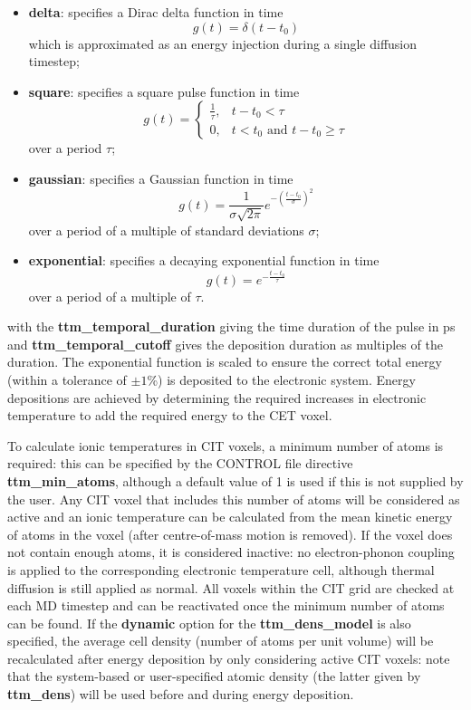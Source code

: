 \begin{itemize}
\item {\bf delta}: specifies a Dirac delta function in time \begin{equation*} g(t) = \delta (t - t_0) \end{equation*} which is approximated as an energy injection during a single diffusion timestep;
\item {\bf square}: specifies a square pulse function in time \begin{equation*} g(t) = \left\{\begin{array}{lr} \frac{1}{\tau}, & t - t_0 < \tau\\ 0, & t<t_0 \text{ and } t - t_0 \ge \tau \end{array} \right. \end{equation*} over a period $\tau$;
\item {\bf gaussian}: specifies a Gaussian function in time \begin{equation*} g(t) = \frac{1}{\sigma\sqrt{2\pi}}e^{-\left(\frac{t-t_0}{\sigma}\right)^2} \end{equation*} over a period of a multiple of standard deviations $\sigma$;
\item {\bf exponential}: specifies a decaying exponential function in time \begin{equation*} g(t) = e^{-\frac{t-t_0}{\tau}} \end{equation*} over a period of a multiple of $\tau$.
\end{itemize}
with the {\bf ttm\_temporal\_duration} giving the time duration of the pulse
in ps and {\bf ttm\_temporal\_cutoff} gives the deposition duration as 
multiples of the duration. The exponential function is scaled to ensure 
the correct total energy (within a tolerance of $\pm 1$\%) is deposited 
to the electronic system. Energy depositions are achieved by determining 
the required increases in electronic temperature to add the required energy 
to the CET voxel.

To calculate ionic temperatures in CIT voxels, a minimum number of
atoms is required: this can be specified by the CONTROL file directive
{\bf ttm\_min\_atoms}, although a default value of 1 is used if this is not supplied
by the user. Any CIT voxel that includes this number of atoms will be
considered as active and an ionic temperature can be calculated from
the mean kinetic energy of atoms in the voxel (after centre-of-mass
motion is removed). If the voxel does not contain enough atoms, it is
considered inactive: no electron-phonon coupling is applied to the
corresponding electronic temperature cell, although thermal diffusion is
still applied as normal. All voxels within the CIT grid are checked
at each MD timestep and can be reactivated once the minimum number
of atoms can be found. If the {\bf dynamic} option for the {\bf ttm\_dens\_model}  
is also specified, the average cell density (number of atoms per unit volume) 
will be recalculated after energy deposition by only considering active CIT
voxels: note that the system-based or user-specified atomic density 
(the latter given by {\bf ttm\_dens}) will be used before and during energy deposition.


